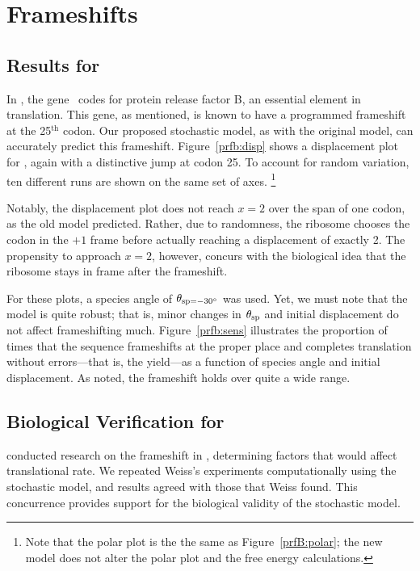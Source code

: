 \documentclass[12pt, draft]{article}
\numberwithin{equation}{section}
\begin{document}
\section{Frameshifts}

\subsection{Results for \prfB}

In \ecoli, the gene \prfB\ codes for protein release factor B, an essential element in translation.
This gene, as mentioned, is known to have a programmed frameshift at
the 25$^{\textrm{th}}$ codon.
Our proposed stochastic model, as with the original model, can accurately predict this frameshift.
Figure~\ref{prfb:disp} shows a displacement plot for \prfB, again with a distinctive jump at codon 25.
To account for random variation, ten different runs are shown on the same set of axes.
\footnote{Note that the polar plot is the the same as Figure~\ref{prfB:polar}; 
the new model does not alter the polar plot and the free energy calculations.}

Notably, the displacement plot does not reach $x=2$ over the span of one codon, as the old model predicted.
Rather, due to randomness, the ribosome chooses the codon in the $+1$ frame before actually reaching a displacement of exactly 2.
The propensity to approach $x=2$, however, concurs with the biological idea that the ribosome stays in frame after the frameshift.

For these plots, a species angle of $\theta_{\rm{sp}=-30^\circ}$ was used.
Yet, we must note that the model is quite robust; that is, minor changes
in $\theta_{\rm{sp}}$ and initial displacement do not affect frameshifting much.
Figure~\ref{prfb:sens} illustrates the proportion of times that the sequence
frameshifts at the proper place and completes translation without errors---that is, the yield---as
a function of species angle and initial displacement.  As noted,
the frameshift holds over quite a wide range.

\subsection{Biological Verification for \prfB}

\citet{weiss87,weiss88} conducted research on the
frameshift in \prfB, determining factors that would affect
translational rate.  We repeated Weiss's experiments computationally
using the stochastic model, and results agreed with those that Weiss found.
This concurrence provides support for the biological validity of
the stochastic model.
\end{document}
